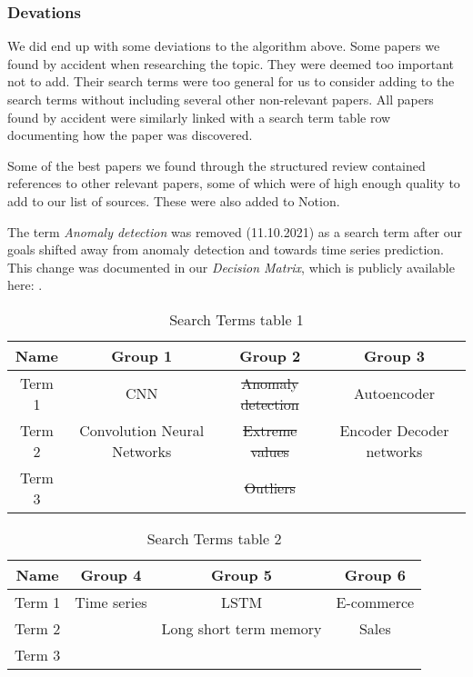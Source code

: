 \subsubsection{Devations}
We did end up with some deviations to the algorithm above.
Some papers we found by accident when researching the topic.
They were deemed too important not to add.
Their search terms were too general for us to consider adding to the search terms without including several other non-relevant papers.
All papers found by accident were similarly linked with a search term table row documenting
how the paper was discovered.

Some of the best papers we found through the structured review contained references to other relevant papers,
some of which were of high enough quality to add to our list of sources.
These were also added to Notion.

The term \textit{Anomaly detection} was removed (11.10.2021) as a search term after our goals shifted away from anomaly detection and towards time series prediction.
This change was documented in our \textit{Decision Matrix}, which is publicly available here:
\cite{decisionmatrix}.

\begin{table}[h]
    \centering
    \begin{tabular}{|c|c|c|c|}\hline\hline
        Name   & Group 1                     & Group 2                  & Group 3                  \\ \hline
        Term 1 & CNN                         & \sout{Anomaly detection} & Autoencoder              \\ \hline
        Term 2 & Convolution Neural Networks & \sout{Extreme values}    & Encoder Decoder networks \\ \hline
        Term 3 &                             & \sout{Outliers}          &                          \\ \hline
    \end{tabular}
    \caption{Search Terms table 1}
    \label{tab:search-terms-table-1}
\end{table}%

\begin{table}[h]
    \begin{center}
        \begin{tabular}{|c|c|c|c|}\hline\hline
            Name   & Group 4     & Group 5                & Group 6    \\ \hline
            Term 1 & Time series & LSTM                   & E-commerce \\ \hline
            Term 2 &             & Long short term memory & Sales      \\ \hline
            Term 3 &             &                        &            \\ \hline
        \end{tabular}
        \caption{Search Terms table 2}
        \label{tab:search-terms-table-2}
    \end{center}
\end{table}%

